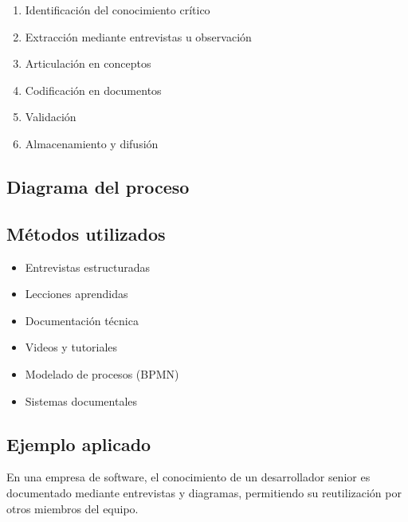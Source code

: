 \documentclass[12pt,a4paper]{article}
\begin{document}
\begin{enumerate}
    \item Identificación del conocimiento crítico
    \item Extracción mediante entrevistas u observación
    \item Articulación en conceptos
    \item Codificación en documentos
    \item Validación
    \item Almacenamiento y difusión
\end{enumerate}

\subsection{Diagrama del proceso}

\begin{center}
\end{center}

\subsection{Métodos utilizados}
\begin{itemize}
    \item Entrevistas estructuradas
    \item Lecciones aprendidas
    \item Documentación técnica
    \item Videos y tutoriales
    \item Modelado de procesos (BPMN)
    \item Sistemas documentales
\end{itemize}

\subsection{Ejemplo aplicado}
En una empresa de software, el conocimiento de un desarrollador senior es documentado mediante entrevistas y diagramas, permitiendo su reutilización por otros miembros del equipo.
\end{document}
